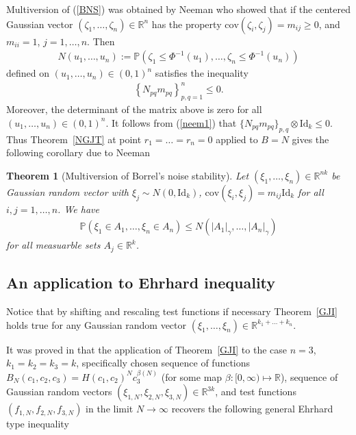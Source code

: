 \documentclass[9pt, a4paper]{amsart}
\newcommand{\1}{{\chi_{}}}%
\newtheorem{atheorem}{Theorem}[section]
\numberwithin{equation}{section}
\begin{document}
Multiversion of (\ref{BNS}) was obtained by Neeman \cite{Neeman14} who showed that if the centered Gaussian vector $(\zeta_{1}, \ldots, \zeta_{n}) \in \mathbb{R}^{n}$  has the property $\mathrm{cov}(\zeta_{i}, \zeta_{j})=m_{ij}\geq 0$, and $m_{ii}=1$, $j=1, \ldots, n$. Then 
\begin{align*}
    N(u_{1}, \ldots, u_{n}) := \mathbb{P}(\zeta_{1}\leq \Phi^{-1}(u_{1}), \ldots, \zeta_{n}\leq \Phi^{-1}(u_{n}))
\end{align*}
defined on $(u_{1}, \ldots, u_{n})\in (0,1)^{n}$ satisfies the inequality 
\begin{align}\label{neem1}
    \left\{ N_{pq}m_{pq}\right\}_{p,q=1}^{n}\leq 0.
\end{align}
Moreover, the determinant of the matrix above is zero for all $(u_{1}, \ldots, u_{n})\in (0,1)^{n}$. It follows from (\ref{neem1}) that $\{N_{pq}m_{pq}\}_{p,q}\otimes \mathrm{Id}_{k}\leq 0$. Thus Theorem~\ref{NGJT} at point $r_{1}=\ldots=r_{n}=0$ applied to $B=N$ gives the following corollary due to Neeman~\cite{Neeman14}
\begin{atheorem}[Multiversion of Borrel's noise stability]
Let $(\xi_{1}, \ldots, \xi_{n})\in \mathbb{R}^{nk}$ be Gaussian random vector with $\xi_{j} \sim N(0, \mathrm{Id}_{k})$, $\mathrm{cov}(\xi_{i}, \xi_{j})=m_{ij}\mathrm{Id}_{k}$ for all $i,j=1, \ldots, n$. We have  
\begin{align*}
    \mathbb{P}(\xi_{1} \in A_{1}, \ldots, \xi_{n} \in A_{n})\leq N(|A_{1}|_{\gamma}, \ldots, |A_{n}|_{\gamma})
\end{align*}
for all measuarble sets $A_{j}\in \mathbb{R}^{k}$.
\end{atheorem}

\subsection{An application to Ehrhard inequality}
Notice that by shifting and rescaling test functions if necessary Theorem~\ref{GJI} holds true for any Gaussian random vector $(\xi_{1}, \ldots, \xi_{n}) \in \mathbb{R}^{k_{1}+\ldots+k_{n}}$. 

It was proved in \cite{IvanisviliEhrhard} that the application of Theorem~\ref{GJI} to the case $n=3$, $k_{1}=k_{2}=k_{3}=k$, specifically chosen sequence of functions $B_{N}(c_{1}, c_{2}, c_{3}) = H(c_{1}, c_{2})^{N} c_{3}^{\beta(N)}$ (for some map $\beta : [0, \infty) \mapsto \mathbb{R}$), sequence of Gaussian random vectors $(\xi_{1, N}, \xi_{2, N}, \xi_{3, N}) \in \mathbb{R}^{3k}$, and test functions $(f_{1, N}, f_{2, N}, f_{3, N})$ in the limit $N\to \infty$ recovers the following general Ehrhard type  inequality
\end{document}
